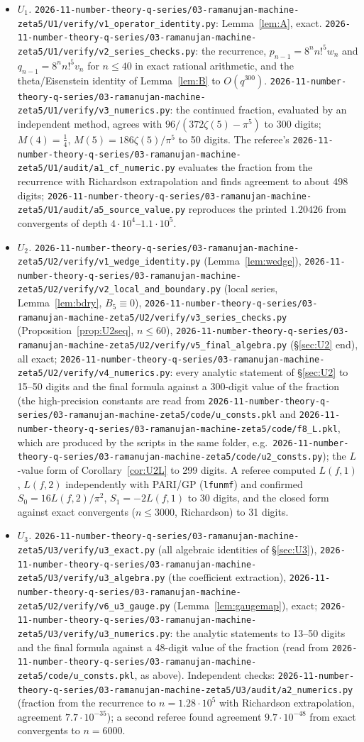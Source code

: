 \documentclass[11pt]{amsart}
\theoremstyle{definition}
\theoremstyle{remark}
\numberwithin{equation}{section}
\newcommand{\file}[1]{\nolinkurl{2026-11-number-theory-q-series/03-ramanujan-machine-zeta5/#1}}
\begin{document}
\begin{itemize}[leftmargin=1.3em]
\item \emph{$U_1$.} \file{U1/verify/v1_operator_identity.py}: Lemma~\ref{lem:A}, exact. \file{U1/verify/v2_series_checks.py}: the recurrence, $p_{n-1}=8^nn!^5w_n$ and $q_{n-1}=8^nn!^5v_n$ for $n\le40$ in exact rational arithmetic, and the theta/Eisenstein identity of Lemma~\ref{lem:B} to $O(q^{300})$. \file{U1/verify/v3_numerics.py}: the continued fraction, evaluated by an independent method, agrees with $96/(372\zeta(5)-\pi^5)$ to 300 digits; $M(4)=\frac14$, $M(5)=186\zeta(5)/\pi^5$ to 50 digits. The referee's \file{U1/audit/a1_cf_numeric.py} evaluates the fraction from the recurrence with Richardson extrapolation and finds agreement to about 498 digits; \file{U1/audit/a5_source_value.py} reproduces the printed $1.20426$ from convergents of depth $4\cdot10^4$--$1.1\cdot10^5$.
\item \emph{$U_2$.} \file{U2/verify/v1_wedge_identity.py} (Lemma~\ref{lem:wedge}), \file{U2/verify/v2_local_and_boundary.py} (local series, Lemma~\ref{lem:bdry}, $B_5\equiv0$), \file{U2/verify/v3_series_checks.py} (Proposition~\ref{prop:U2seq}, $n\le60$), \file{U2/verify/v5_final_algebra.py} (\S\ref{sec:U2} end), all exact; \file{U2/verify/v4_numerics.py}: every analytic statement of \S\ref{sec:U2} to 15--50 digits and the final formula against a 300-digit value of the fraction (the high-precision constants are read from \file{code/u_consts.pkl} and \file{code/f8_L.pkl}, which are produced by the scripts in the same folder, e.g.\ \file{code/u2_consts.py}); the $L$-value form of Corollary~\ref{cor:U2L} to 299 digits. A referee computed $L(f,1)$, $L(f,2)$ independently with PARI/GP (\texttt{lfunmf}) and confirmed $S_0=16L(f,2)/\pi^2$, $S_1=-2L(f,1)$ to 30 digits, and the closed form against exact convergents ($n\le3000$, Richardson) to 31 digits.
\item \emph{$U_3$.} \file{U3/verify/u3_exact.py} (all algebraic identities of \S\ref{sec:U3}), \file{U3/verify/u3_algebra.py} (the coefficient extraction), \file{U2/verify/v6_u3_gauge.py} (Lemma~\ref{lem:gaugemap}), exact; \file{U3/verify/u3_numerics.py}: the analytic statements to 13--50 digits and the final formula against a 48-digit value of the fraction (read from \file{code/u_consts.pkl}, as above). Independent checks: \file{U3/audit/a2_numerics.py} (fraction from the recurrence to $n=1.28\cdot10^5$ with Richardson extrapolation, agreement $7.7\cdot10^{-35}$); a second referee found agreement $9.7\cdot10^{-48}$ from exact convergents to $n=6000$.

\end{itemize}
\end{document}
